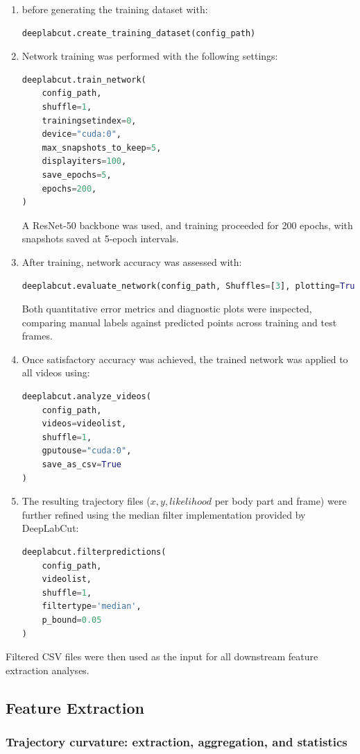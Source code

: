 \begin{enumerate}[label=\alph*.]
    \item before generating the training dataset with:
\begin{lstlisting}[language=Python]
deeplabcut.create_training_dataset(config_path)
\end{lstlisting}
    \item Network training was performed with the following settings:
\begin{lstlisting}[language=Python]
deeplabcut.train_network(
    config_path,
    shuffle=1,
    trainingsetindex=0,
    device="cuda:0",
    max_snapshots_to_keep=5,
    displayiters=100,
    save_epochs=5,
    epochs=200,
)
\end{lstlisting}
A ResNet-50 backbone was used, and training proceeded for 200 epochs, with snapshots saved at 5-epoch intervals. 
    \item After training, network accuracy was assessed with:
\begin{lstlisting}[language=Python]
deeplabcut.evaluate_network(config_path, Shuffles=[3], plotting=True)
\end{lstlisting}
Both quantitative error metrics and diagnostic plots were inspected, comparing manual labels against predicted points across training and test frames. 
    \item Once satisfactory accuracy was achieved, the trained network was applied to all videos using:
\begin{lstlisting}[language=Python]
deeplabcut.analyze_videos(
    config_path,
    videos=videolist,
    shuffle=1,
    gputouse="cuda:0",
    save_as_csv=True
)
\end{lstlisting}
    \item The resulting trajectory files ($x, y, likelihood$ per body part and frame) were further refined using the median filter implementation provided by DeepLabCut:
\begin{lstlisting}[language=Python]
deeplabcut.filterpredictions(
    config_path,
    videolist,
    shuffle=1,
    filtertype='median',
    p_bound=0.05
)
\end{lstlisting}
\end{enumerate}
Filtered CSV files were then used as the input for all downstream feature extraction analyses.

\subsection*{Feature Extraction}
\subsubsection{Trajectory curvature: extraction, aggregation, and statistics}

